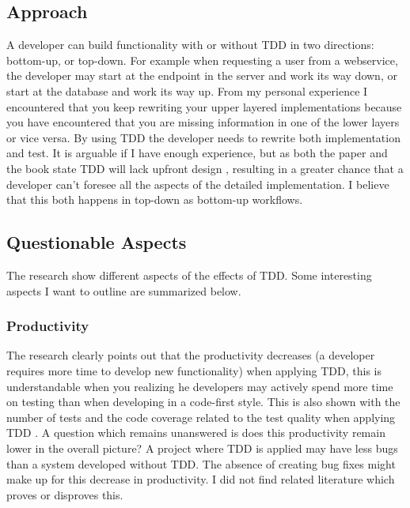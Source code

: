 \subsection*{Approach}


A developer can build functionality with or without TDD in two directions: bottom-up, or top-down. For example when
requesting a user from a webservice, the developer may start at the endpoint in the server and work its way down, or
start at the database and work its way up. From my personal experience I encountered that you keep rewriting your
upper layered implementations because you have encountered that you are missing information in one of the lower
layers or vice versa. By using TDD the developer needs to rewrite both implementation and test. It is arguable if I
have enough experience, but as both the paper and the book state TDD will lack upfront design \autocite[338]{SAC-J-2003-GeorgeW04} \autocite[212]{MAKING_SOFTWARE},
resulting in a
greater chance that a developer can't foresee all the aspects of the detailed implementation. I believe that this both
happens in top-down as bottom-up workflows.

\subsection*{Questionable Aspects}

The research show different aspects of the effects of TDD. Some interesting aspects I want to outline are summarized below.

\subsubsection*{Productivity}

The research clearly points out that the productivity decreases (a developer requires more time to develop new
functionality) when applying TDD, this is understandable when you realizing he developers may actively spend more time
on testing than when developing in a code-first style. This is also shown with the number of tests and the code
coverage related to the test quality when applying TDD \autocite[341]{SAC-J-2003-GeorgeW04}. A question which remains unanswered is does this
productivity remain lower in the overall picture? A project where TDD is applied may have less bugs than a system
developed without TDD. The absence of creating bug fixes might make up for this decrease in productivity. I did not
find related literature which proves or disproves this.

